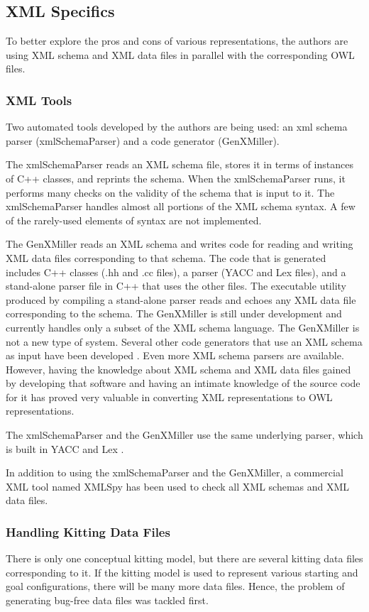 \subsection{XML Specifics}
To better explore the pros and cons of various representations,
the authors are using XML schema and XML data files in parallel with the
corresponding OWL files.

\subsubsection{XML Tools}
Two automated tools developed by the authors are being used: an xml schema
parser (xmlSchemaParser) and a code generator (GenXMiller).

The xmlSchemaParser reads an XML schema file, stores it in terms of
instances of C++ classes, and reprints the schema. When the xmlSchemaParser
runs, it performs many checks on the validity of the schema that is input
to it. The xmlSchemaParser handles almost all portions of the XML schema
syntax. A few of the rarely-used elements of syntax are not implemented.

The GenXMiller reads an XML schema and writes code for reading and writing
XML data files corresponding to that schema. The code that is generated
includes C++ classes (.hh and .cc files), a parser (YACC and Lex files), and
a stand-alone parser file in C++ that uses the other files.  The executable
utility produced by compiling a stand-alone parser reads and echoes any XML
data file corresponding to the schema. The GenXMiller is still under
development and currently handles only a subset of the XML schema language.
The GenXMiller is not a
new type of system. Several other code generators that use an XML schema
as input have been developed \cite{XMLSchema1,ApacheXML}.
Even more XML schema parsers are
available. However, having the knowledge about XML schema and XML data
files gained by developing that software and having an intimate knowledge
of the source code for it has proved very valuable in converting XML representations
to OWL representations.

The xmlSchemaParser and the GenXMiller use the same underlying parser,
which is built in YACC and Lex \cite{LexAndYACC}.

In addition to using the xmlSchemaParser and the GenXMiller, a commercial
XML tool named XMLSpy \cite{XMLSpyManual} has been used to check all XML
schemas and XML data files.

\subsubsection{Handling Kitting Data Files}
There is only one conceptual kitting model, but there are several kitting
data files corresponding to it. If the kitting model is used to represent
various starting and goal configurations, there
will be many more data files. Hence, the problem of generating bug-free
data files was tackled first.

